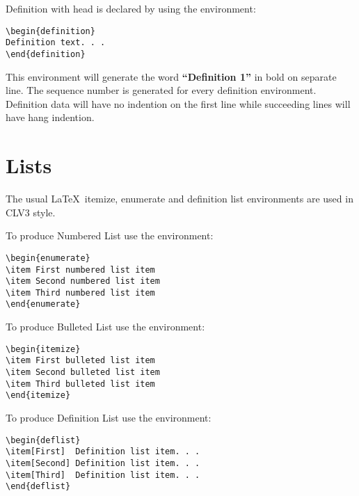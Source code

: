 \documentclass{clv3}
\begin{document}
Definition with head is declared by using the environment:
\\
\begin{verbatim}
\begin{definition}
Definition text. . .
\end{definition}
\end{verbatim}

This environment will generate the word {\bf ``Definition 1''} in bold on separate
line. The sequence number is generated for every definition environment. Definition 
data will have no indention on the first line while succeeding lines will have hang 
indention.

\section{Lists}

The usual \LaTeX\ itemize, enumerate and definition list environments are used 
in CLV3 style. 

To produce Numbered List use the environment:

\begin{verbatim}
\begin{enumerate}
\item First numbered list item
\item Second numbered list item
\item Third numbered list item
\end{enumerate}
\end{verbatim}

To produce Bulleted List use the environment:

\begin{verbatim}
\begin{itemize}
\item First bulleted list item
\item Second bulleted list item
\item Third bulleted list item
\end{itemize}
\end{verbatim}

To produce Definition List use the environment:

\begin{verbatim}
\begin{deflist}
\item[First]  Definition list item. . .
\item[Second] Definition list item. . .
\item[Third]  Definition list item. . .
\end{deflist}
\end{verbatim}
\end{document}
